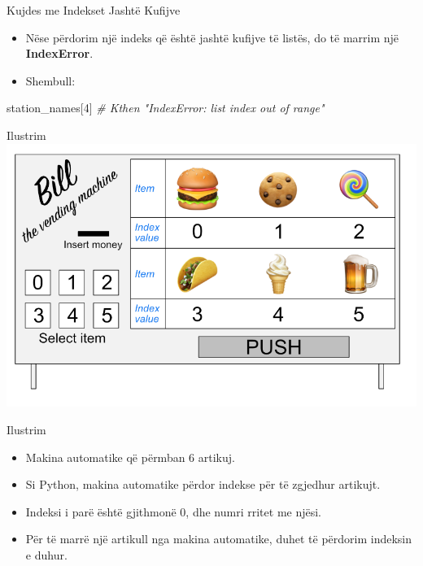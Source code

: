 \documentclass[
  ignorenonframetext,
]{beamer}
\newenvironment{Shaded}{\begin{snugshade}}{\end{snugshade}}
\newcommand{\CommentTok}[1]{\textcolor[rgb]{0.56,0.35,0.01}{\textit{#1}}}
\newcommand{\DecValTok}[1]{\textcolor[rgb]{0.00,0.00,0.81}{#1}}
\newcommand{\NormalTok}[1]{#1}
\begin{document}
\begin{frame}[fragile]{Kujdes me Indekset Jashtë Kufijve}
\protect\hypertarget{kujdes-me-indekset-jashtuxeb-kufijve}{}
\begin{itemize}
\item
  Nëse përdorim një indeks që është jashtë kufijve të listës, do të
  marrim një \textbf{IndexError}.
\item
  Shembull:
\end{itemize}

\begin{Shaded}
\begin{Highlighting}[]
\NormalTok{station\_names[}\DecValTok{4}\NormalTok{]  }\CommentTok{\# Kthen "IndexError: list index out of range"}
\end{Highlighting}
\end{Shaded}
\end{frame}

\begin{frame}{Ilustrim}
\protect\hypertarget{ilustrim}{}
\includegraphics{./Figs/index.png}
\end{frame}

\begin{frame}{Ilustrim}
\protect\hypertarget{ilustrim-1}{}
\begin{itemize}
\item
  Makina automatike që përmban 6 artikuj.
\item
  Si Python, makina automatike përdor indekse për të zgjedhur artikujt.
\item
  Indeksi i parë është gjithmonë 0, dhe numri rritet me njësi.
\item
  Për të marrë një artikull nga makina automatike, duhet të përdorim
  indeksin e duhur.
\end{itemize}
\end{frame}
\end{document}
